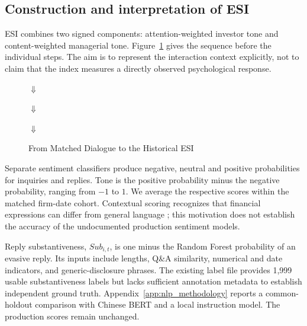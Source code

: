 \subsection{Construction and interpretation of ESI}\label{sec:esi_construction}
ESI combines two signed components: attention-weighted investor tone and content-weighted managerial tone. Figure~\ref{fig:esi_flow} gives the sequence before the individual steps. The aim is to represent the interaction context explicitly, not to claim that the index measures a directly observed psychological response.
\begin{figure}[H]\centering\small
{}
\par\smallskip$\Downarrow$\par\smallskip
{}
\par\smallskip$\Downarrow$\par\smallskip
{}
\par\smallskip$\Downarrow$\par\smallskip
{}
\caption{From Matched Dialogue to the Historical ESI}\label{fig:esi_flow}
\end{figure}
Separate sentiment classifiers produce negative, neutral and positive probabilities for inquiries and replies. Tone is the positive probability minus the negative probability, ranging from $-1$ to $1$. We average the respective scores within the matched firm-date cohort. Contextual scoring recognizes that financial expressions can differ from general language \citep{loughran2011}; this motivation does not establish the accuracy of the undocumented production sentiment models.

Reply substantiveness, $Sub_{i,t}$, is one minus the Random Forest probability of an evasive reply. Its inputs include lengths, Q\&A similarity, numerical and date indicators, and generic-disclosure phrases. The existing label file provides 1,999 usable substantiveness labels but lacks sufficient annotation metadata to establish independent ground truth. Appendix~\ref{app:nlp_methodology} reports a common-holdout comparison with Chinese BERT and a local instruction model. The production scores remain unchanged.

